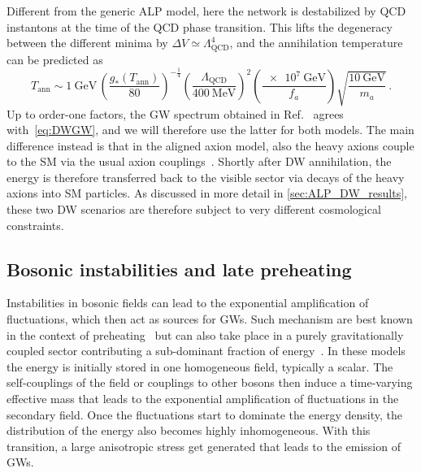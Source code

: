 \documentclass{article}
\newcommand*{\geff}{\ensuremath{g_{*}}\xspace}
\begin{document}
Different from the generic ALP model, here the network is destabilized by QCD instantons at the time of the QCD phase transition. This lifts the degeneracy between the different minima by $\Delta V \simeq \Lambda_\mathrm{QCD}^{4}$, and the annihilation temperature can be predicted as~\cite{Higaki:2016jjh}
\begin{equation}
    T_\mathrm{ann} \sim \SI{1}{\GeV}\, \left(\frac{\geff(T_\mathrm{ann})}{80}\right)^{-\frac{1}{4}}\left(\frac{\Lambda_\mathrm{QCD}}{\SI{400}{\MeV}}\right)^{2}\left(\frac{\SI{e7}{\GeV}}{f_a}\right) \sqrt{\frac{\SI{10}{\GeV}}{m_a}}\,.
\end{equation}
%
Up to order-one factors, the GW spectrum obtained in Ref.~\cite{Higaki:2016jjh} agrees with~\cref{eq:DWGW}, and we will therefore use the latter for both models. The main difference instead is that in the aligned axion model, also the heavy axions couple to the SM via the usual axion couplings~\cite{Higaki:2015jag}. Shortly after DW annihilation, the energy is therefore transferred back to the visible sector via decays of the heavy axions into SM particles. As discussed in more detail in \cref{sec:ALP_DW_results}, these two DW scenarios are therefore subject to very different cosmological constraints. 

\subsection{Bosonic instabilities and late preheating}
\label{sec:audible_axion}

Instabilities in bosonic fields can lead to the exponential amplification of fluctuations, which then act as sources for GWs. Such mechanism are best known in the context of preheating~\cite{Greene:1997fu,Kofman:1994rk,Shtanov:1994ce,Kofman:1997yn,Dufaux:2007pt,Figueroa:2016wxr} but can also take place in a purely gravitationally coupled sector contributing a sub-dominant fraction of energy~\cite{Machado:2018nqk,Chatrchyan:2020pzh,Kitajima:2020rpm,Banerjee:2021oeu,Madge:2021abk,Eroncel:2022vjg}. In these models the energy is initially stored in one homogeneous field, typically a scalar. The self-couplings of the field or couplings to other bosons then induce a time-varying effective mass that leads to the exponential amplification of fluctuations in the secondary field. Once the fluctuations start to dominate the energy density, the distribution of the energy also becomes highly inhomogeneous. With this transition, a large anisotropic stress get generated that leads to the emission of GWs.
\end{document}
